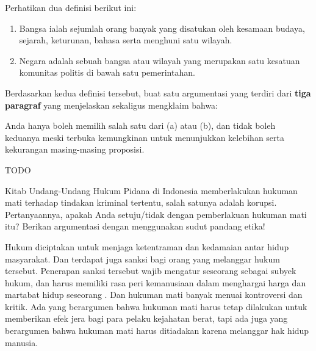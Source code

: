 \documentclass[
  12pt,
  answers  
]{exam}
\begin{document}
    \begin{questions}
      \question 
      Perhatikan dua definisi berikut ini:
      \begin{enumerate}
        \item Bangsa ialah sejumlah orang banyak yang disatukan oleh kesamaan budaya, sejarah, keturunan, bahasa serta menghuni satu wilayah.
        \item Negara adalah sebuah bangsa atau wilayah yang merupakan satu kesatuan komunitas politis di bawah satu pemerintahan.
      \end{enumerate}

      Berdasarkan kedua definisi tersebut, buat satu argumentasi yang terdiri dari \textbf{tiga paragraf} yang menjelaskan sekaligus mengklaim bahwa:

      Anda hanya boleh memilih salah satu dari (a) atau (b), dan tidak boleh keduanya meski terbuka kemungkinan untuk menunjukkan kelebihan serta kekurangan masing-masing proposisi.
      \begin{solution}
        TODO
      \end{solution}
      \question
      Kitab Undang-Undang Hukum Pidana di Indonesia memberlakukan hukuman mati terhadap tindakan kriminal tertentu, salah satunya adalah korupsi. Pertanyaannya, apakah Anda setuju/tidak dengan pemberlakuan hukuman mati itu? Berikan argumentasi dengan menggunakan sudut pandang etika!
      \begin{solution}
        Hukum diciptakan untuk menjaga ketentraman dan kedamaian antar hidup masyarakat. Dan terdapat juga sanksi bagi orang yang melanggar hukum tersebut. Penerapan sanksi tersebut wajib mengatur seseorang sebagai subyek hukum, dan harus memiliki rasa peri kemanusiaan dalam menghargai harga dan martabat hidup seseorang \cite{siburianHUKUMANMATIDI2021}. Dan hukuman mati banyak menuai kontroversi dan kritik. Ada yang berargumen bahwa hukuman mati harus tetap dilakukan untuk memberikan efek jera bagi para pelaku kejahatan berat, tapi ada juga yang berargumen bahwa hukuman mati harus ditiadakan karena melanggar hak hidup manusia. 


\end{solution}
\end{questions}
\end{document}
